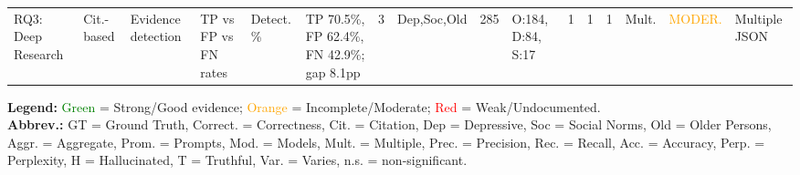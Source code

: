 \begin{landscape}
{\begin{longtable}{@{}p{1.8cm}p{1.2cm}p{1.5cm}p{1.8cm}p{1.2cm}p{2.8cm}p{0.5cm}p{1.5cm}p{1cm}p{2cm}p{0.6cm}p{0.6cm}p{0.8cm}p{1.5cm}p{1.2cm}p{2cm}@{}}
RQ3: Deep Research & Cit.-based & Evidence detection & TP vs FP vs FN rates & Detect. \% & TP 70.5\%, FP 62.4\%, FN 42.9\%; gap 8.1pp & 3 & Dep,Soc,Old & 285 & O:184, D:84, S:17 & 1 & 1 & 1 & Mult. & \textcolor{orange}{MODER.} & Multiple JSON \\

\end{longtable}
}

\vspace{0.3cm}

\noindent\textbf{Legend:} 
\textcolor{green}{Green} = Strong/Good evidence; 
\textcolor{orange}{Orange} = Incomplete/Moderate; 
\textcolor{red}{Red} = Weak/Undocumented. \\
\textbf{Abbrev.:} GT = Ground Truth, Correct. = Correctness, Cit. = Citation, Dep = Depressive, Soc = Social Norms, Old = Older Persons, Aggr. = Aggregate, Prom. = Prompts, Mod. = Models, Mult. = Multiple, Prec. = Precision, Rec. = Recall, Acc. = Accuracy, Perp. = Perplexity, H = Hallucinated, T = Truthful, Var. = Varies, n.s. = non-significant.

\end{landscape}
